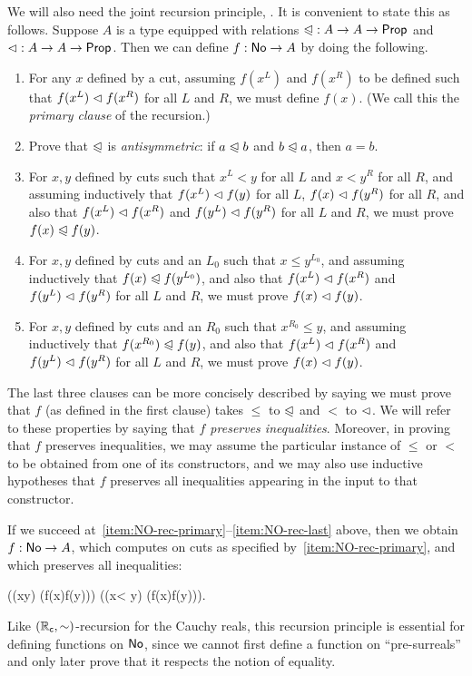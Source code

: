 We will also need the joint recursion principle, .
It is convenient to state this as follows.
Suppose $A$ is a type equipped with relations $\mathord{\trianglelefteqslant}:A\to A\to\mathsf{Prop}$ and $\mathord{\vartriangleleft}:A\to A\to\mathsf{Prop}$.
Then we can define $f:\mathsf{No}\to A$ by doing the following.
\begin{enumerate}
\item For any $x$ defined by a cut, assuming $f(x^L)$ and $f(x^R)$ to be defined such that $f(x^L)\vartriangleleft f(x^R)$ for all $L$ and $R$, we must define $f(x)$.  (We call this the \emph{primary clause} of the recursion.)\label{item:NO-rec-primary}
\item Prove that $\trianglelefteqslant$ is \emph{antisymmetric}: if $a\trianglelefteqslant b$ and $b\trianglelefteqslant a$, then $a=b$.
\item For $x,y$ defined by cuts such that $x^L<y$ for all $L$ and $x<y^R$ for all $R$, and assuming inductively that $f(x^L)\vartriangleleft f(y)$ for all $L$, $f(x)\vartriangleleft f(y^R)$ for all $R$, and also that $f(x^L)\vartriangleleft f(x^R)$ and $f(y^L)\vartriangleleft f(y^R)$ for all $L$ and $R$, we must prove $f(x)\trianglelefteqslant f(y)$.
\item For $x,y$ defined by cuts and an $L_0$ such that $x\le y^{L_0}$, and assuming inductively that $f(x)\trianglelefteqslant f(y^{L_0})$, and also that $f(x^L)\vartriangleleft f(x^R)$ and $f(y^L)\vartriangleleft f(y^R)$ for all $L$ and $R$, we must prove $f(x)\vartriangleleft f(y)$.
\item For $x,y$ defined by cuts and an $R_0$ such that $x^{R_0}\le y$, and assuming inductively that $f(x^{R_0})\trianglelefteqslant f(y)$, and also that $f(x^L)\vartriangleleft f(x^R)$ and $f(y^L)\vartriangleleft f(y^R)$ for all $L$ and $R$, we must prove $f(x)\vartriangleleft f(y)$.\label{item:NO-rec-last}
\end{enumerate}
The last three clauses can be more concisely described by saying we must prove that $f$ (as defined in the first clause) takes $\le$ to $\trianglelefteqslant$ and $<$ to $\vartriangleleft$.
We will refer to these properties by saying that \emph{$f$ preserves inequalities}.
Moreover, in proving that $f$ preserves inequalities, we may assume the particular instance of $\le$ or $<$ to be obtained from one of its constructors, and we may also use inductive hypotheses that $f$ preserves all inequalities appearing in the input to that constructor.

If we succeed at~\ref{item:NO-rec-primary}--\ref{item:NO-rec-last} above, then we obtain $f:\mathsf{No}\to A$, which computes on cuts as specified by~\ref{item:NO-rec-primary}, and which preserves all inequalities:
%
\begin{narrowmultline*}
  \Big((x\le y) \to (f(x)\ble f(y))\Big) \land
  \narrowbreak
  \Big((x< y) \to (f(x)\blt f(y))\Big).
\end{narrowmultline*}
%
Like $(\mathbb{R}_\mathsf{c},\mathord\sim)$-recursion for the Cauchy reals, this recursion principle is essential for defining functions on $\mathsf{No}$, since we cannot first define a function on ``pre-surreals'' and only later prove that it respects the notion of equality.

